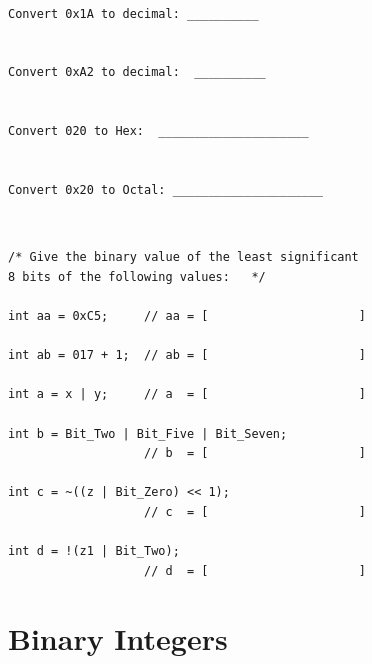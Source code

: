 %
%
%
%
%
%
%
%
%
%
%
%
%
%
%
%
%

\begin{verbatim}

Convert 0x1A to decimal: __________


Convert 0xA2 to decimal:  __________


Convert 020 to Hex:  _____________________


Convert 0x20 to Octal: _____________________

\end{verbatim}

{\tt
\begin{verbatim}
/* Give the binary value of the least significant
8 bits of the following values:   */

int aa = 0xC5;     // aa = [                     ]

int ab = 017 + 1;  // ab = [                     ]

int a = x | y;     // a  = [                     ]

int b = Bit_Two | Bit_Five | Bit_Seven;
                   // b  = [                     ]

int c = ~((z | Bit_Zero) << 1);
                   // c  = [                     ]

int d = !(z1 | Bit_Two);
                   // d  = [                     ]
\end{verbatim}
}

\newpage	%
\section{Binary Integers}

